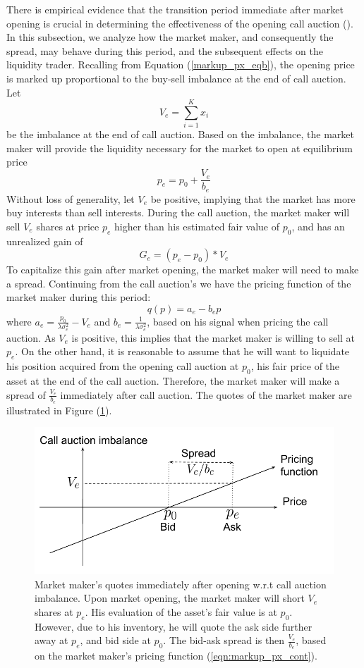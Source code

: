 There is empirical evidence that the transition period immediate after market opening is crucial in determining the effectiveness of the opening call auction (\cite{Pagano2013}). In this subsection, we analyze how the market maker, and consequently the spread, may behave during this period, and the subsequent effects on the liquidity trader. Recalling from Equation (\ref{markup_px_eqb}), the opening price is marked up proportional to the buy-sell imbalance at the end of call auction. Let
\[
  V_e = \sum_{i=1}^K x_i
\]
be the imbalance at the end of call auction. Based on the imbalance, the market maker will provide the liquidity necessary for the market to open at equilibrium price
\[
  p_e = p_0 + \frac{V_e}{b_e}
\]
Without loss of generality, let $V_e$ be positive, implying that the market has more buy interests than sell interests. During the call auction, the market maker will sell $V_e$ shares at price $p_e$ higher than his estimated fair value of $p_0$, and has an unrealized gain of
\[
  G_e = (p_e - p_0) * V_e
\]
To capitalize this gain after market opening, the market maker will need to make a spread. Continuing from the call auction's we have the pricing function of the market maker during this period:
\[
  q(p) = a_e - b_e p
\]
where $a_e = \frac{p_0}{\lambda \sigma_e^2} - V_e$ and $b_e=\frac{1}{\lambda \sigma_e^2}$, based on his signal when pricing the call auction. As $V_e$ is positive, this implies that the market maker is willing to sell at $p_e$. On the other hand, it is reasonable to assume that he will want to liquidate his position acquired from the opening call auction at $p_0$, his fair price of the asset at the end of the call auction. Therefore, the market maker will make a spread of $\frac{V_e}{b_e}$ immediately after call auction. The quotes of the market maker are illustrated in Figure (\ref{fig:mm_pricing_transition}).

\begin{figure}[h]
  \includegraphics[width=\textwidth]{images/MMPricingTransition}
  \caption{Market maker's quotes immediately after opening w.r.t call auction imbalance. Upon market opening, the market maker will short $V_e$ shares at $p_e$. His evaluation of the asset's fair value is at $p_0$. However, due to his inventory, he will quote the ask side further away at $p_e$, and bid side at $p_0$. The bid-ask spread is then $\frac{V_e}{b_e}$, based on the market maker's pricing function (\ref{eqn:markup_px_cont}).}
  \label{fig:mm_pricing_transition}
\end{figure}

